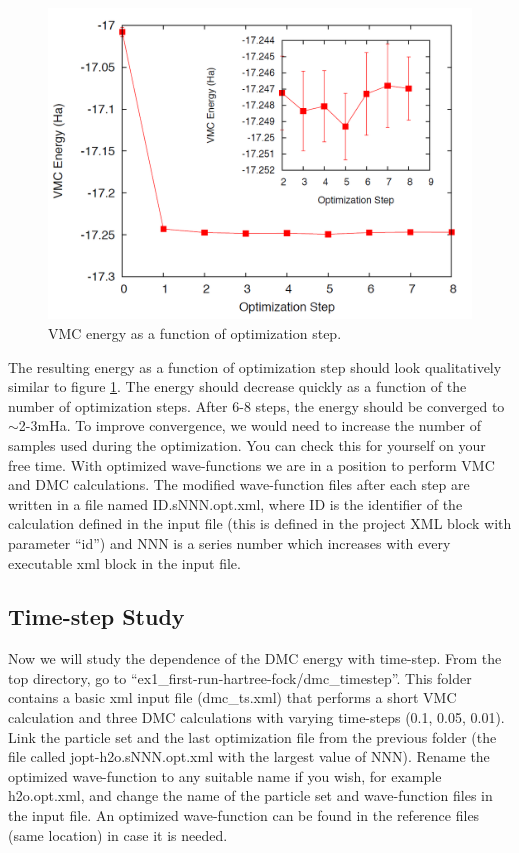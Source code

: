 \begin{figure}
\begin{center}
\includegraphics[trim = 0mm 0mm 0mm 0mm, clip,width=0.75\columnwidth]{figures/lab_advanced_molecules_opt_conv.png}
\end{center}
\caption{VMC energy as a function of optimization step.}
\label{fig:lam_opt_conv}
\end{figure}

The resulting energy as a function of optimization step should look qualitatively similar to figure \ref{fig:lam_opt_conv}.
The energy should decrease quickly as a function of the number of optimization steps. After 6-8 steps, the energy should be converged to $\sim$2-3mHa. To improve convergence,
we would need to increase the number of samples used during the optimization. You can
check this for yourself on your free time. With optimized wave-functions we are in a position
to perform VMC and DMC calculations. The modified wave-function files after each step
are written in a file named ID.sNNN.opt.xml, where ID is the identifier of the calculation
defined in the input file (this is defined in the project XML block with parameter “id”) and
NNN is a series number which increases with every executable xml block in the input file.


\subsection{Time-step Study}
Now we will study the dependence of the DMC energy with time-step. From the top directory, 
go to “ex1\_first-run-hartree-fock/dmc\_timestep”. This folder contains a basic xml input
file (dmc\_ts.xml) that performs a short VMC calculation and three DMC calculations
with varying time-steps (0.1, 0.05, 0.01). Link the particle set and the last optimization
file from the previous folder (the file called jopt-h2o.sNNN.opt.xml with the largest value of
NNN). Rename the optimized wave-function to any suitable name if you wish, for example
h2o.opt.xml, and change the name of the particle set and wave-function files in the
input file. An optimized wave-function can be found in the reference files (same location)
in case it is needed. %

